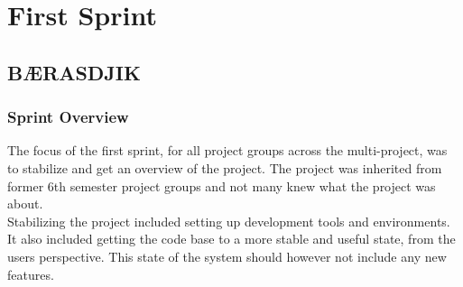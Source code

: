 \part{First Sprint}
\label{par:first_sprint}

\newevenside
\chapter{BÆRASDJIK} %
\label{cha:b_rasdjik}

\section{Sprint Overview}
The focus of the first sprint, for all project groups across the multi-project, was to stabilize and get an overview of the project. The project was inherited from former 6th semester project groups and not many knew what the \giraf project was about.
\\
Stabilizing the project included setting up development tools and environments. It also included getting the code base to a more stable and useful state, from the users perspective. This state of the system should however not include any new features.



